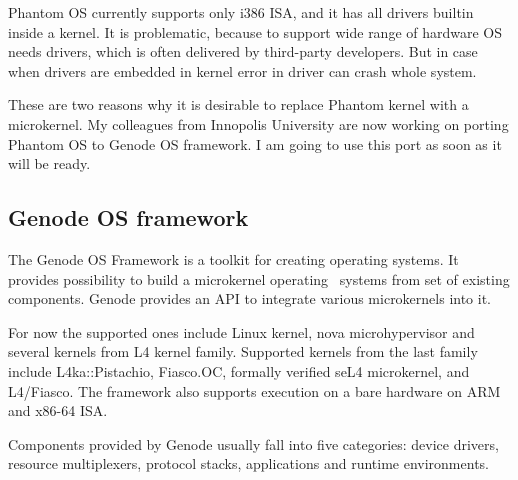 Phantom OS currently supports only i386 ISA, and it has all drivers builtin 
inside a kernel. It is problematic, because to support wide range of hardware
OS needs drivers, which is often delivered by third-party developers. But in
case when drivers are embedded in kernel error in driver can crash whole system.

These are two reasons why it is desirable to replace Phantom kernel with a 
microkernel. My colleagues from Innopolis University are now working on porting
Phantom OS to Genode OS  framework. I am going to use this port as soon as it 
will be ready.

\subsection{Genode OS framework} 
The Genode OS Framework \cite{feske2015genode} is a toolkit for creating 
operating systems. It provides possibility to build a microkernel operating \
systems from set of existing components. Genode provides an API to integrate 
various microkernels into it.

For now the supported ones include Linux kernel, nova microhypervisor and several
kernels from L4 kernel family. Supported kernels from the last family include
L4ka::Pistachio, Fiasco.OC, formally verified seL4 microkernel, and L4/Fiasco.
The framework also supports execution on a bare hardware on ARM and x86-64 ISA.

Components provided by Genode usually fall into five categories: device drivers,
resource multiplexers, protocol stacks, applications and runtime environments.